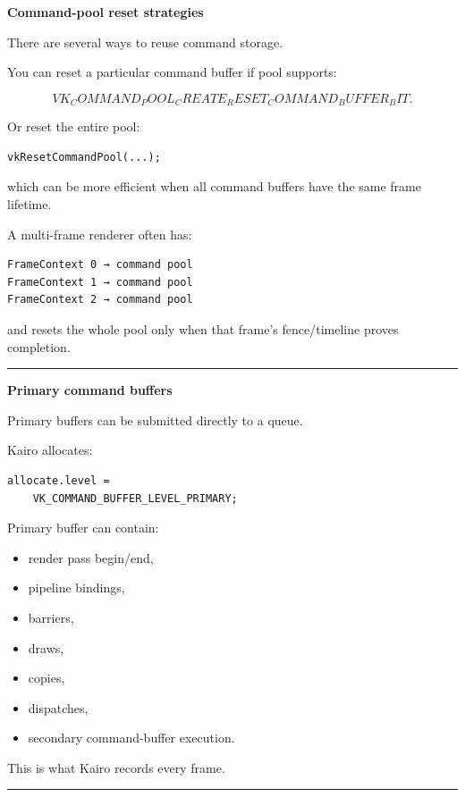 \textbf{Command-pool reset strategies}

There are several ways to reuse command storage.

You can reset a particular command buffer if pool supports:

\[
VK_COMMAND_POOL_CREATE_RESET_COMMAND_BUFFER_BIT.
\]

Or reset the entire pool:

\begin{verbatim}
vkResetCommandPool(...);
\end{verbatim}

which can be more efficient when all command buffers have the same frame lifetime.

A multi-frame renderer often has:

\begin{verbatim}
FrameContext 0 → command pool
FrameContext 1 → command pool
FrameContext 2 → command pool
\end{verbatim}

and resets the whole pool only when that frame's fence/timeline proves completion.

\begin{center}\rule{0.5\linewidth}{0.5pt}\end{center}

\textbf{Primary command buffers}

Primary buffers can be submitted directly to a queue.

Kairo allocates:

\begin{verbatim}
allocate.level =
    VK_COMMAND_BUFFER_LEVEL_PRIMARY;
\end{verbatim}

Primary buffer can contain:

\begin{itemize}
\tightlist
\item
  render pass begin/end,
\item
  pipeline bindings,
\item
  barriers,
\item
  draws,
\item
  copies,
\item
  dispatches,
\item
  secondary command-buffer execution.
\end{itemize}

This is what Kairo records every frame.

\begin{center}\rule{0.5\linewidth}{0.5pt}\end{center}

